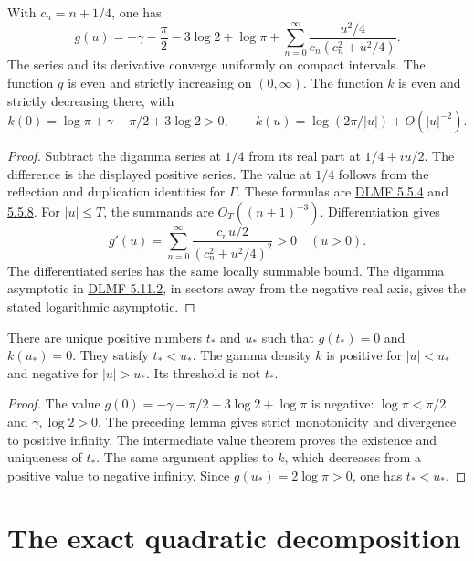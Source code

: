 \begin{lemma}
\label{v4-arith:w6-a:lem:g-hurwitz}
\label{v4-arith:w6-a:lem:g-monotone}
\label{v4-arith:w6-a:prop:g-boundary}
With $c_n=n+1/4$, one has
\[
 g(u)=-\gamma-\frac\pi2-3\log2+\log\pi
       +\sum_{n=0}^\infty\frac{u^2/4}{c_n(c_n^2+u^2/4)}.
\]
The series and its derivative converge uniformly on compact intervals.
The function $g$ is even and strictly increasing on $(0,\infty)$.
The function $k$ is even and strictly decreasing there, with
\[
 k(0)=\log\pi+\gamma+\pi/2+3\log2>0,\qquad
 k(u)=\log(2\pi/|u|)+O(|u|^{-2}).
\]
\end{lemma}
\begin{proof}
Subtract the digamma series at $1/4$ from its real part at
$1/4+iu/2$. The difference is the displayed positive series.
The value at $1/4$ follows from the reflection and duplication
identities for $\Gamma$. These formulas are
\href{https://dlmf.nist.gov/5.5.E4}{DLMF 5.5.4} and
\href{https://dlmf.nist.gov/5.5.E8}{5.5.8}.
For $|u|\le T$, the summands are $O_T((n+1)^{-3})$.
Differentiation gives
\[
 g'(u)=\sum_{n=0}^\infty
       \frac{c_nu/2}{(c_n^2+u^2/4)^2}>0\quad(u>0).
\]
The differentiated series has the same locally summable bound.
The digamma asymptotic in
\href{https://dlmf.nist.gov/5.11.E2}{DLMF 5.11.2}, in sectors away
from the negative real axis, gives the stated logarithmic asymptotic.
\end{proof}

\begin{proposition}
\label{v4-arith:w6-a:thm:t-star}
\label{v4-arith:w6-a:prop:t-star-numerical}
There are unique positive numbers $t_*$ and $u_*$ such that
$g(t_*)=0$ and $k(u_*)=0$. They satisfy $t_*<u_*$.
The gamma density $k$ is positive for $|u|<u_*$ and negative for
$|u|>u_*$. Its threshold is not $t_*$.
\end{proposition}
\begin{proof}
The value $g(0)=-\gamma-\pi/2-3\log2+\log\pi$ is negative:
$\log\pi<\pi/2$ and $\gamma,\log2>0$.
The preceding lemma gives strict monotonicity and divergence to
positive infinity. The intermediate value theorem proves the
existence and uniqueness of $t_*$.
The same argument applies to $k$, which decreases from a positive
value to negative infinity. Since $g(u_*)=2\log\pi>0$, one has
$t_*<u_*$.
\end{proof}

\section{The exact quadratic decomposition}
\label{v4-arith:w6-a:decomposition}

